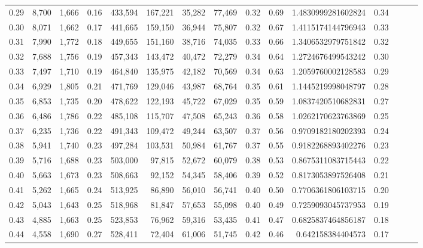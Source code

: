 \begin{tabular}{rrrrrrrrrrrrrrr}
0.29 &   8,700 &  1,666 &  0.16 &  433,594 &  167,221 &   35,282 &   77,469 &  0.32 &  0.69 &    1.4830999281602824 &      0.34 \\
0.30 &   8,071 &  1,662 &  0.17 &  441,665 &  159,150 &   36,944 &   75,807 &  0.32 &  0.67 &    1.4115174144796943 &      0.33 \\
0.31 &   7,990 &  1,772 &  0.18 &  449,655 &  151,160 &   38,716 &   74,035 &  0.33 &  0.66 &    1.3406532979751842 &      0.32 \\
0.32 &   7,688 &  1,756 &  0.19 &  457,343 &  143,472 &   40,472 &   72,279 &  0.34 &  0.64 &    1.2724676499543242 &      0.30 \\
0.33 &   7,497 &  1,710 &  0.19 &  464,840 &  135,975 &   42,182 &   70,569 &  0.34 &  0.63 &    1.2059760002128583 &      0.29 \\
0.34 &   6,929 &  1,805 &  0.21 &  471,769 &  129,046 &   43,987 &   68,764 &  0.35 &  0.61 &    1.1445219998048797 &      0.28 \\
0.35 &   6,853 &  1,735 &  0.20 &  478,622 &  122,193 &   45,722 &   67,029 &  0.35 &  0.59 &    1.0837420510682831 &      0.27 \\
0.36 &   6,486 &  1,786 &  0.22 &  485,108 &  115,707 &   47,508 &   65,243 &  0.36 &  0.58 &    1.0262170623763869 &      0.25 \\
0.37 &   6,235 &  1,736 &  0.22 &  491,343 &  109,472 &   49,244 &   63,507 &  0.37 &  0.56 &    0.9709182180202393 &      0.24 \\
0.38 &   5,941 &  1,740 &  0.23 &  497,284 &  103,531 &   50,984 &   61,767 &  0.37 &  0.55 &    0.9182268893402276 &      0.23 \\
0.39 &   5,716 &  1,688 &  0.23 &  503,000 &   97,815 &   52,672 &   60,079 &  0.38 &  0.53 &    0.8675311083715443 &      0.22 \\
0.40 &   5,663 &  1,673 &  0.23 &  508,663 &   92,152 &   54,345 &   58,406 &  0.39 &  0.52 &    0.8173053897526408 &      0.21 \\
0.41 &   5,262 &  1,665 &  0.24 &  513,925 &   86,890 &   56,010 &   56,741 &  0.40 &  0.50 &    0.7706361806103715 &      0.20 \\
0.42 &   5,043 &  1,643 &  0.25 &  518,968 &   81,847 &   57,653 &   55,098 &  0.40 &  0.49 &    0.7259093045737953 &      0.19 \\
0.43 &   4,885 &  1,663 &  0.25 &  523,853 &   76,962 &   59,316 &   53,435 &  0.41 &  0.47 &    0.6825837464856187 &      0.18 \\
0.44 &   4,558 &  1,690 &  0.27 &  528,411 &   72,404 &   61,006 &   51,745 &  0.42 &  0.46 &     0.642158384404573 &      0.17 \\

\end{tabular}
